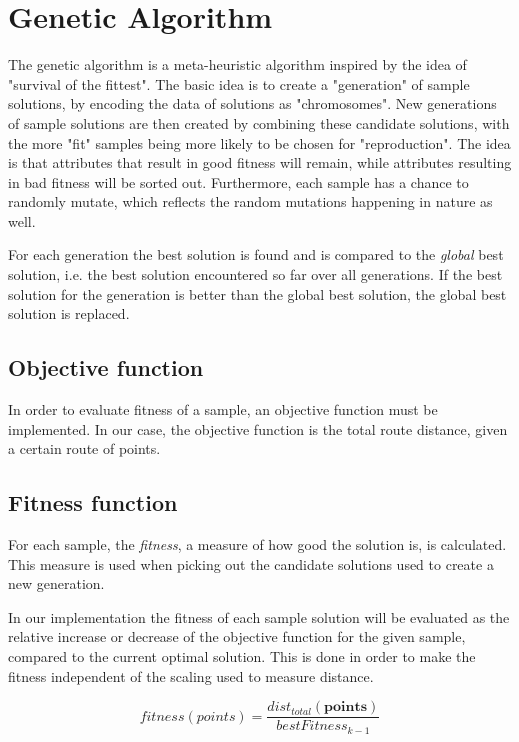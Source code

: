 \section{Genetic Algorithm}
The genetic algorithm is a meta-heuristic algorithm inspired by the idea of "survival of the fittest". The basic idea is to create a "generation" of sample solutions, by encoding the data of solutions as "chromosomes". New generations of sample solutions are then created by combining these candidate solutions, with the more "fit" samples being more likely to be chosen for "reproduction". The idea is that attributes that result in good fitness will remain, while attributes resulting in bad fitness will be sorted out. Furthermore, each sample has a chance to randomly mutate, which reflects the random mutations happening in nature as well.

For each generation the best solution is found and is compared to the \textit{global} best solution, i.e. the best solution encountered so far over all generations. If the best solution for the generation is better than the global best solution, the global best solution is replaced.

\subsection{Objective function}
In order to evaluate fitness of a sample, an objective function must be implemented. In our case, the objective function is the total route distance, given a certain route of points.

\subsection{Fitness function}
For each sample, the \textit{fitness}, a measure of how good the solution is, is calculated. This measure is used when picking out the candidate solutions used to create a new generation.

In our implementation the fitness of each sample solution will be evaluated as the relative increase or decrease of the objective function for the given sample, compared to the current optimal solution. This is done in order to make the fitness independent of the scaling used to measure distance.

\begin{equation}
	fitness(points) = \frac{dist_{total}(\textbf{points})}{bestFitness_{k-1}}
\end{equation}

